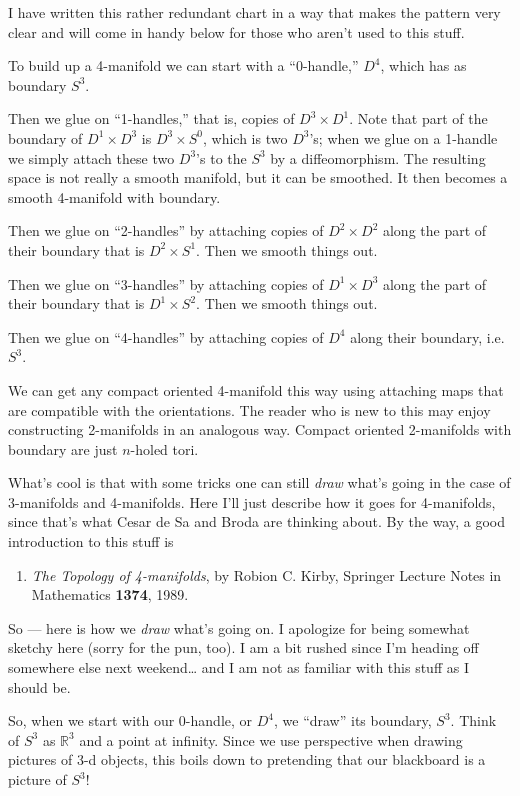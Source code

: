 \documentclass{article}
\begin{document}
I have written this rather redundant chart in a way that makes the
pattern very clear and will come in handy below for those who aren't
used to this stuff.

To build up a 4-manifold we can start with a ``0-handle,'' \(D^4\),
which has as boundary \(S^3\).

Then we glue on ``1-handles,'' that is, copies of \(D^3 \times D^1\).
Note that part of the boundary of \(D^1 \times D^3\) is
\(D^3 \times S^0\), which is two \(D^3\)'s; when we glue on a 1-handle
we simply attach these two \(D^3\)'s to the \(S^3\) by a diffeomorphism.
The resulting space is not really a smooth manifold, but it can be
smoothed. It then becomes a smooth 4-manifold with boundary.

Then we glue on ``2-handles'' by attaching copies of \(D^2 \times D^2\)
along the part of their boundary that is \(D^2 \times S^1\). Then we
smooth things out.

Then we glue on ``3-handles'' by attaching copies of \(D^1 \times D^3\)
along the part of their boundary that is \(D^1 \times S^2\). Then we
smooth things out.

Then we glue on ``4-handles'' by attaching copies of \(D^4\) along their
boundary, i.e.~\(S^3\).

We can get any compact oriented 4-manifold this way using attaching maps
that are compatible with the orientations. The reader who is new to this
may enjoy constructing 2-manifolds in an analogous way. Compact oriented
2-manifolds with boundary are just \(n\)-holed tori.

What's cool is that with some tricks one can still \emph{draw} what's
going in the case of 3-manifolds and 4-manifolds. Here I'll just
describe how it goes for 4-manifolds, since that's what Cesar de Sa and
Broda are thinking about. By the way, a good introduction to this stuff
is

\begin{enumerate}
\def\labelenumi{\arabic{enumi})}
\setcounter{enumi}{3}
\item
\emph{The Topology of 4-manifolds}, by Robion C. Kirby, Springer
Lecture Notes in Mathematics \textbf{1374}, 1989.
\end{enumerate}
\noindent
So --- here is how we \emph{draw} what's going on. I apologize for being
somewhat sketchy here (sorry for the pun, too). I am a bit rushed since
I'm heading off somewhere else next weekend\ldots{} and I am not as
familiar with this stuff as I should be.

So, when we start with our 0-handle, or \(D^4\), we ``draw'' its
boundary, \(S^3\). Think of \(S^3\) as \(\mathbb{R}^3\) and a point at
infinity. Since we use perspective when drawing pictures of 3-d objects,
this boils down to pretending that our blackboard is a picture of
\(S^3\)!
\end{document}
